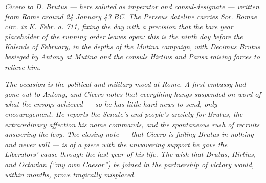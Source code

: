 
\textit{Cicero to D. Brutus --- here saluted as imperator and
consul-designate --- written from Rome around 24 January 43 BC.
The Perseus dateline carries \textit{Scr. Romae circ. ix K.
Febr. a. 711}, fixing the day with a precision that the bare
year placeholder of the running order leaves open: this is the
ninth day before the Kalends of February, in the depths of the
Mutina campaign, with Decimus Brutus besieged by Antony at
Mutina and the consuls Hirtius and Pansa raising forces to
relieve him.}

\textit{The occasion is the political and military mood at
Rome. A first embassy had gone out to Antony, and Cicero notes
that everything hangs suspended on word of what the envoys
achieved --- so he has little hard news to send, only
encouragement. He reports the Senate's and people's anxiety for
Brutus, the extraordinary affection his name commands, and the
spontaneous rush of recruits answering the levy. The closing
note --- that Cicero is failing Brutus in nothing and never
will --- is of a piece with the unwavering support he gave the
Liberators' cause through the last year of his life. The wish
that Brutus, Hirtius, and Octavian (``my own Caesar'') be
joined in the partnership of victory would, within months,
prove tragically misplaced.}
